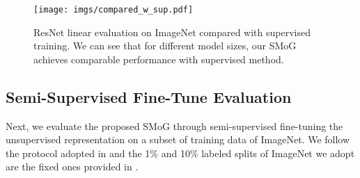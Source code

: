 \documentclass[runningheads]{style/llncs}
\begin{document}
\begin{SCfigure}
	\texttt{[image: imgs/compared\_w\_sup.pdf]}
	\caption{ResNet linear evaluation on ImageNet compared with supervised training. We can see that for different model sizes, our SMoG achieves comparable performance with supervised method.}
	\label{fig:compare_w_sup}
\end{SCfigure}

\subsection{Semi-Supervised Fine-Tune Evaluation}

Next, we evaluate the proposed SMoG through semi-supervised fine-tuning the unsupervised representation on a subset of training data of ImageNet. We follow the protocol adopted in \cite{simclr} and the 1\% and 10\% labeled splits of ImageNet we adopt are the fixed ones provided in \cite{simclr}.

\begin{wraptable}[16]{r}{0.6\linewidth}
	\vspace{-0.05in}
	\caption{Semi-supervised results on ImageNet.}
	\centering
	\setlength\arrayrulewidth{0.8pt}
	\label{tab:semisup_res}
\end{wraptable}
\end{document}
